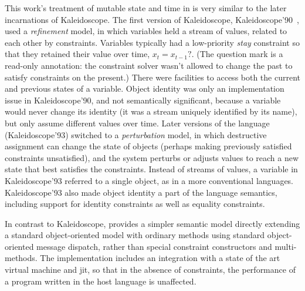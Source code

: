 This work's treatment of mutable state and time in \langname is very
similar to the later incarnations of Kaleidoscope. The first version
of Kaleidoscope, Kaleidoscope'90~\cite{freeman-benson-iccl-1992}, used
a \emph{refinement} model, in which variables held a stream of values,
related to each other by constraints.  Variables typically had a
low-priority \emph{stay} constraint so that they retained their value
over time, \eg \mbox{$x_t = x_{t-1}?$}.  (The question mark is a
read-only annotation: the constraint solver wasn't allowed to change
the past to satisfy constraints on the present.)  There were
facilities to access both the current and previous states of a
variable.  Object identity was only an implementation issue in
Kaleidoscope'90, and not semantically significant, because a variable
would never change its identity (it was a stream uniquely identified
by its name), but only assume different values over time. Later
versions of the language (\eg Kaleidoscope'93)
\cite{lopez-ecoop-1994,lopez-oopsla-1994} switched to a
\emph{perturbation} model, in which destructive assignment can change
the state of objects (perhaps making previously satisfied constraints
unsatisfied), and the system perturbs or adjusts values to reach a new
state that best satisfies the constraints. Instead of streams of
values, a variable in Kaleidoscope'93 referred to a single object, as
in a more conventional languages.  Kaleidoscope'93 also made object
identity a part of the language semantics, including support for
identity constraints as well as equality constraints.

In contrast to Kaleidoscope, \langname provides a simpler semantic
model directly extending a standard object-oriented model with
ordinary methods using standard object-oriented message dispatch,
rather than special constraint constructors and multi-methods.  The
implementation includes an integration with a state of the art virtual
machine and \ac{jit}, so that in the absence of constraints, the
performance of a program written in the host language is unaffected.




